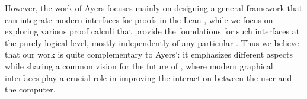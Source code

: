 However, the work of Ayers focuses mainly on designing a general framework that
can integrate modern interfaces for proofs in the Lean , while we
focus on exploring various proof calculi that provide the foundations for such
interfaces at the purely logical level, mostly independently of any particular
. Thus we believe that our work is quite complementary to Ayers':
it emphasizes different aspects while sharing a common vision for the future of
, where modern graphical interfaces play a crucial role in
improving the interaction between the user and the computer.